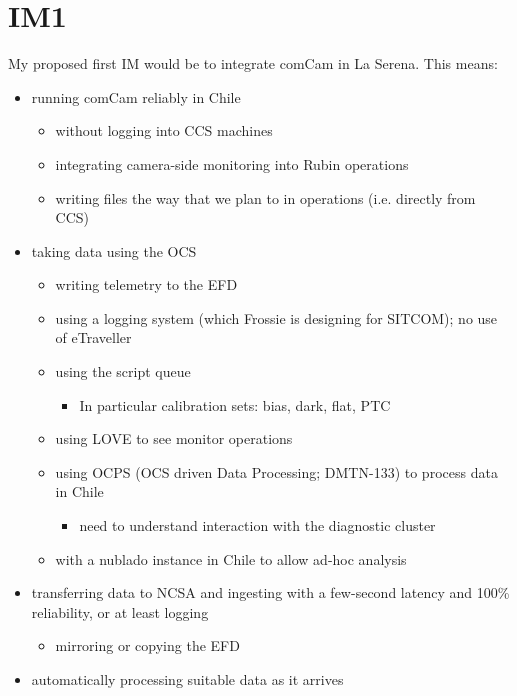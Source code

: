 \section{IM1}


My proposed first IM would be to integrate comCam in La Serena.  This means:
\begin{itemize}
   \item running comCam reliably in Chile
   \begin{itemize}
       \item without logging into CCS machines
       \item integrating camera-side monitoring into Rubin operations
       \item writing files the way that we plan to in operations (i.e. directly from CCS)
   \end{itemize}
   \item taking data using the OCS
       \begin{itemize}
          \item writing telemetry to the EFD
          \item using a logging system (which Frossie is designing for SITCOM); no use of \eg eTraveller
          \item using the script queue
          \begin{itemize}
             \item In particular calibration sets: bias, dark, flat, PTC
          \end{itemize}
          \item using LOVE to see monitor operations
       \item using OCPS (OCS driven Data Processing; DMTN-133) to process data in Chile
       \begin{itemize}
          \item need to understand interaction with the diagnostic cluster
       \end{itemize}
       \item with a nublado instance in Chile to allow ad-hoc analysis
       \end{itemize}
   \item transferring data to NCSA and ingesting with a few-second latency and 100\% reliability,
         or at least logging
   \begin{itemize}
      \item mirroring or copying the EFD
   \end{itemize}
   \item automatically processing suitable data as it arrives

\end{itemize}
